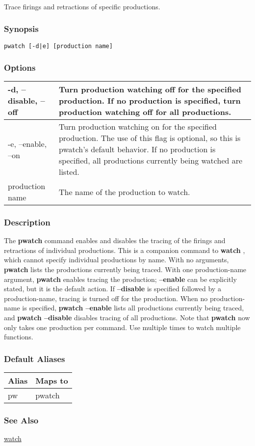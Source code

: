 \subsection{}
\label{pwatch}
Trace firings and retractions of specific productions. 
\subsubsection*{Synopsis}
\begin{verbatim}
pwatch [-d|e] [production name]
\end{verbatim}
\subsubsection*{Options}
\begin{tabular}{|l|l|}
\hline 
 -d, --disable, --off  & Turn production watching off for the specified production. If no production is specified, turn production watching off for all productions.  \\
 \hline 
 -e, --enable, --on  & Turn production watching on for the specified production. The use of this flag is optional, so this is pwatch's default behavior. If no production is specified, all productions currently being watched are listed.  \\
 \hline 
production name & The name of the production to watch.  \\
 \hline 
\end{tabular}
\subsubsection*{Description}
 The \textbf{pwatch}
 command enables and disables the tracing of the firings and retractions of individual productions. This is a companion command to \textbf{watch}
, which cannot specify individual productions by name. 
 With no arguments, \textbf{pwatch}
 lists the productions currently being traced. With one production-name argument, \textbf{pwatch}
 enables tracing the production; \textbf{--enable}
 can be explicitly stated, but it is the default action. 
 If \textbf{--disable}
 is specified followed by a production-name, tracing is turned off for the production. When no production-name is specified, \textbf{pwatch --enable}
 lists all productions currently being traced, and \textbf{pwatch --disable}
 disables tracing of all productions. 
 Note that \textbf{pwatch}
 now only takes one production per command. Use multiple times to watch multiple functions. 
\subsubsection*{Default Aliases}
\begin{tabular}{|l|l|}
\hline 
 Alias  & Maps to  \\
 \hline 
 pw  & pwatch  \\
 \hline 
\end{tabular}
\subsubsection*{See Also}
\hyperref[watch]{watch} 